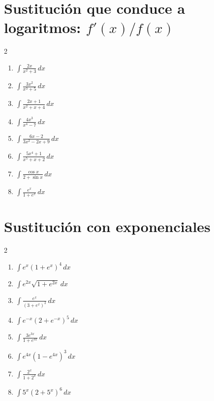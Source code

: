 \documentclass[11pt]{article}
\begin{document}
\section{Sustitución que conduce a logaritmos: $f'(x)/f(x)$}
\begin{multicols}{2}\begin{enumerate}
\item $\displaystyle \int\frac{2x}{x^2+3}\,dx$
\item $\displaystyle \int\frac{3x^2}{x^3+5}\,dx$
\item $\displaystyle \int\frac{2x+1}{x^2+x+4}\,dx$
\item $\displaystyle \int\frac{4x^3}{x^4-7}\,dx$
\item $\displaystyle \int\frac{6x-2}{3x^2-2x+9}\,dx$
\item $\displaystyle \int\frac{5x^4+1}{x^5+x+2}\,dx$
\item $\displaystyle \int\frac{\cos x}{2+\sin x}\,dx$
\item $\displaystyle \int\frac{e^x}{1+e^x}\,dx$
\end{enumerate}\end{multicols}

\section{Sustitución con exponenciales}
\begin{multicols}{2}\begin{enumerate}
\item $\displaystyle \int e^x(1+e^x)^4\,dx$
\item $\displaystyle \int e^{2x}\sqrt{1+e^{2x}}\,dx$
\item $\displaystyle \int\frac{e^x}{(3+e^x)^2}\,dx$
\item $\displaystyle \int e^{-x}(2+e^{-x})^5\,dx$
\item $\displaystyle \int\frac{3e^{3x}}{1+e^{3x}}\,dx$
\item $\displaystyle \int e^{4x}(1-e^{4x})^3\,dx$
\item $\displaystyle \int\frac{2^x}{1+2^x}\,dx$
\item $\displaystyle \int 5^x(2+5^x)^6\,dx$
\end{enumerate}\end{multicols}
\end{document}
